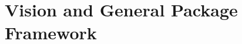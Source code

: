 \documentclass[twocolumn]{aastex62}
\begin{document}





\section{Vision and General Package Framework}
\label{sec:vision}
\end{document}
